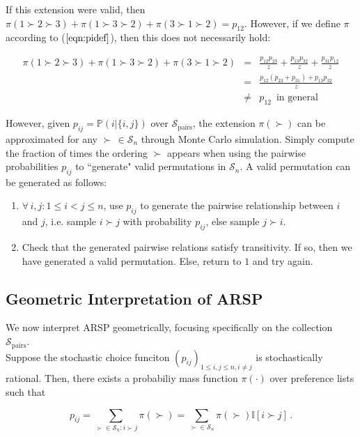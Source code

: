 \documentclass[11pt]{article}
\begin{document}
If this extension were valid, then $\pi(1 \succ 2 \succ 3) + \pi(1 \succ 3 \succ 2) + \pi(3 \succ 1 \succ 2) = p_{12}$. However, if we define $\pi$ according to ($\ref{eqn:pidef}$), then this does not necessarily hold:

\begin{eqnarray*}
\pi(1 \succ 2 \succ 3) + \pi(1 \succ 3 \succ 2) + \pi(3 \succ 1 \succ 2) &=& \frac{p_{12} p_{23}}{z} + \frac{p_{13} p_{32}}{z} + \frac{p_{31} p_{12}}{z} \\
&=& \frac{p_{12} (p_{23}+p_{31})+p_{13}p_{32}}{z} \\
&\neq& p_{12} \, \, \,\text{in general}
\end{eqnarray*}

However, given $p_{ij} = \mathbb{P}(i | \{i,j\})$ over $\mathcal{S}_{\text{pairs}}$, the extension $\pi(\succ)$ can be approximated for any $\succ \, \in \mathcal{S}_n$ through Monte Carlo simulation. Simply compute the fraction of times the ordering $\succ$ appears when using the pairwise probabilities $p_{ij}$ to ``generate" valid permutations in $\mathcal{S}_n$. A valid permutation can be generated as follows:

\begin{enumerate}
	\item $\forall \, i,j: 1 \leq i < j \leq n$, use $p_{ij}$ to generate the pairwise relationship between $i$ and $j$, i.e. sample $i \succ j$ with probability $p_{ij}$, else sample $j \succ i$.
	\item Check that the generated pairwise relations satisfy transitivity. If so, then we have generated a valid permutation. Else, return to $1$ and try again.
\end{enumerate}

\subsection{Geometric Interpretation of ARSP}

We now interpret ARSP geometrically, focusing specifically on the collection $\mathcal{S}_{\text{pairs}}$.
\\

Suppose the stochastic choice funciton $(p_{ij})_{1 \leq i,j \leq n, i \neq j}$ is stochastically rational. Then, there exists a probabiliy mass function $\pi(\cdot)$ over preference lists such that

\begin{equation*}
p_{ij} = \sum_{\succ \in \mathcal{S}_n : i \succ j} \pi(\succ) = \sum_{\succ \in \mathcal{S}_n} \pi(\succ) \mathbb{I}[i \succ j]\, .
\end{equation*}
\end{document}
